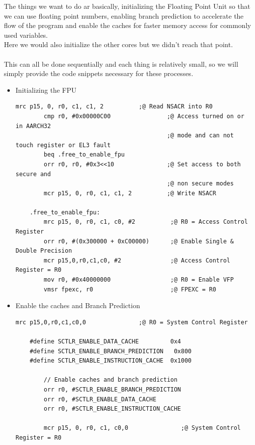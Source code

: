 \documentclass[12pt, svgnames]{book}
\begin{document}
The things we want to do ar basically, initializing the Floating Point Unit so that we can use floating point numbers, enabling branch prediction to accelerate the flow of the program and enable the caches for faster memory access for commonly used variables.
\\
Here we would also initialize the other cores but we didn't reach that point.
\\~\\
This can all be done sequentially and each thing is relatively small, so we will simply provide the code snippets necessary for these processes.
\newpage
 \begin{itemize}
 	\item Initializing the FPU
 	\begin{lstlisting}[language=ASM,title={Code provided by \href{https://www.raspberrypi.org/forums/memberlist.php?mode=viewprofile&u=213434}{Leon de Boer}},captionpos=b]
	 	mrc p15, 0, r0, c1, c1, 2          ;@ Read NSACR into R0
	 	cmp r0, #0x00000C00                ;@ Access turned on or in AARCH32 
	 	                                   ;@ mode and can not touch register or EL3 fault
	 	beq .free_to_enable_fpu
	 	orr r0, r0, #0x3<<10               ;@ Set access to both secure and 
		                                   ;@ non secure modes
	 	mcr p15, 0, r0, c1, c1, 2          ;@ Write NSACR
 	
 	.free_to_enable_fpu:
	 	mrc p15, 0, r0, c1, c0, #2          ;@ R0 = Access Control Register
	 	orr r0, #(0x300000 + 0xC00000)      ;@ Enable Single & Double Precision
	 	mcr p15,0,r0,c1,c0, #2              ;@ Access Control Register = R0
	 	mov r0, #0x40000000                 ;@ R0 = Enable VFP
	 	vmsr fpexc, r0                      ;@ FPEXC = R0
 	\end{lstlisting}
 	
 	\item Enable the caches and Branch Prediction
 	\begin{lstlisting}[language=ASM,title={Code provided by \href{https://www.raspberrypi.org/forums/memberlist.php?mode=viewprofile&u=213434}{Leon de Boer}},captionpos=b]
	 	mrc p15,0,r0,c1,c0,0               ;@ R0 = System Control Register
 	
 	#define SCTLR_ENABLE_DATA_CACHE         0x4
 	#define SCTLR_ENABLE_BRANCH_PREDICTION   0x800
 	#define SCTLR_ENABLE_INSTRUCTION_CACHE  0x1000
 	
	 	// Enable caches and branch prediction
	 	orr r0, #SCTLR_ENABLE_BRANCH_PREDICTION
	 	orr r0, #SCTLR_ENABLE_DATA_CACHE
	 	orr r0, #SCTLR_ENABLE_INSTRUCTION_CACHE
 	
	 	mcr p15, 0, r0, c1, c0,0               ;@ System Control Register = R0
 	\end{lstlisting}
 \end{itemize}
 
\end{document}
